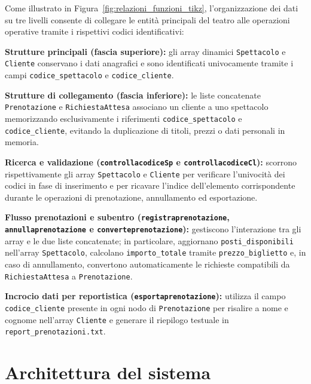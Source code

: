 \documentclass[11pt,a4paper,oneside,openany]{book}
\newenvironment{listacomp}{%
    \small
    \begin{list}{\textendash}{%
        \setlength{\topsep}{2pt}%
        \setlength{\partopsep}{0pt}%
        \setlength{\itemsep}{1pt}%
        \setlength{\parsep}{0pt}%
        \setlength{\leftmargin}{1.2em}%
    }%
}{%
    \end{list}%
}
\begin{document}
Come illustrato in Figura~\ref{fig:relazioni_funzioni_tikz}, l'organizzazione dei dati su tre livelli consente di collegare le entità principali del teatro alle operazioni operative tramite i rispettivi codici identificativi:
\begin{listacomp}
    \item \textbf{Strutture principali (fascia superiore):} gli array dinamici \texttt{Spettacolo} e \texttt{Cliente} conservano i dati anagrafici e sono identificati univocamente tramite i campi \texttt{codice\_spettacolo} e \texttt{codice\_cliente}.
    \item \textbf{Strutture di collegamento (fascia inferiore):} le liste concatenate \texttt{Prenotazione} e \texttt{RichiestaAttesa} associano un cliente a uno spettacolo memorizzando esclusivamente i riferimenti \texttt{codice\_spettacolo} e \texttt{codice\_cliente}, evitando la duplicazione di titoli, prezzi o dati personali in memoria.
    \item \textbf{Ricerca e validazione (\texttt{controllacodiceSp} e \texttt{controllacodiceCl}):} scorrono rispettivamente gli array \texttt{Spettacolo} e \texttt{Cliente} per verificare l'univocità dei codici in fase di inserimento e per ricavare l'indice dell'elemento corrispondente durante le operazioni di prenotazione, annullamento ed esportazione.
    \item \textbf{Flusso prenotazioni e subentro (\texttt{registraprenotazione}, \texttt{annullaprenotazione} e \texttt{converteprenotazione}):} gestiscono l'interazione tra gli array e le due liste concatenate; in particolare, aggiornano \texttt{posti\_disponibili} nell'array \texttt{Spettacolo}, calcolano \texttt{importo\_totale} tramite \texttt{prezzo\_biglietto} e, in caso di annullamento, convertono automaticamente le richieste compatibili da \texttt{RichiestaAttesa} a \texttt{Prenotazione}.
    \item \textbf{Incrocio dati per reportistica (\texttt{esportaprenotazione}):} utilizza il campo \texttt{codice\_cliente} presente in ogni nodo di \texttt{Prenotazione} per risalire a nome e cognome nell'array \texttt{Cliente} e generare il riepilogo testuale in \texttt{report\_prenotazioni.txt}.
\end{listacomp}

\section{Architettura del sistema}

\end{document}
